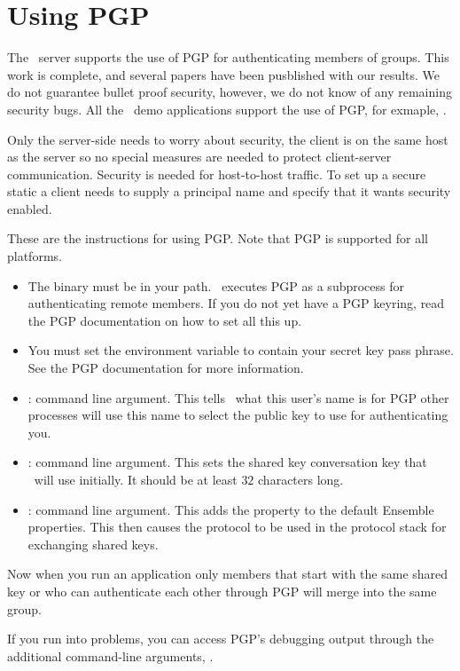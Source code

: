 %
%
%
\section{Using PGP}

The \ensemble\ server supports the use of PGP for authenticating members of
groups.  This work is complete, and several papers have been
pusblished with our results. We do not guarantee bullet proof
security, however, we do not know of any remaining security bugs.
All the \ensemble\ demo applications support the use of PGP, for
exmaple, . 

Only the server-side needs to worry about security, the client is on
the same host as the server so no special measures are needed to
protect client-server communication. Security is needed for
host-to-host traffic. To set up a secure static a client needs to
supply a principal name and specify that it wants security enabled. 

These are the instructions for using PGP. Note that PGP is 
supported for all platforms.

\begin{itemize}
\item
The  binary must be in your path.  \ensemble\ executes PGP
as a subprocess for authenticating remote members.  If you do not yet
have a PGP keyring, read the PGP documentation on how to set all this
up.
\item
You must set the  environment variable to contain your
secret key pass phrase.  See the PGP documentation for more
information.
\item
{} : command line argument.  This tells \ensemble\ what
this user's name is for PGP other processes will use this name to
select the public key to use for authenticating you.
\item
{}: command line argument.  This sets the shared
key conversation key that \ensemble\ will use initially.  It should
be at least $32$ characters long.
\item
{}: command line argument.  This adds the
 property to the default Ensemble properties.  This then
causes the  protocol to be used in the protocol stack
for exchanging shared keys.
\end{itemize}

Now when you run an application only members that start with the same
shared key or who can authenticate each other through PGP will
merge into the same group.

If you run into problems, you can access PGP's debugging output
through the additional command-line arguments, .
